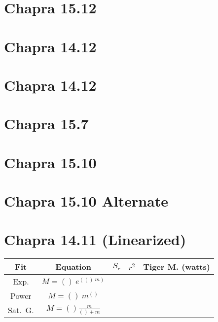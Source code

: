 \documentclass{article}
\begin{document}
\section{Chapra 15.12}

\section{Chapra 14.12}

\section{Chapra 14.12}

\section{Chapra 15.7}

\section{Chapra 15.10}

\section{Chapra 15.10 Alternate}


\section{Chapra 14.11 (Linearized)}
\begin{center}
\begin{tabular}{|c|c|c|c|c|}\hline 
Fit & Equation & $S_r$ & $r^2$ & Tiger M. (watts) \\\hline 
Exp.    & $M=()~e^{(()~m)}$    & ~ &  &  \\\hline 
Power   & $M=()~m^{()}$         & ~ &  &  \\\hline 
Sat.~G. & $M=()\frac{m}{()+m}$ & ~ &  &  \\\hline 
\end{tabular}
\end{center}
\end{document}
